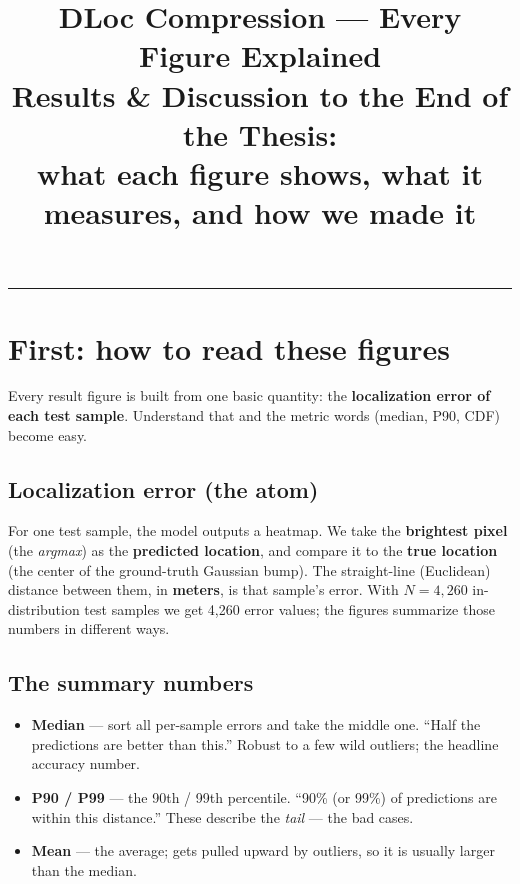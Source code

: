 \documentclass[11pt]{article}
\title{\textbf{DLoc Compression --- Every Figure Explained}\\[2mm]
\large Results \& Discussion to the End of the Thesis:\\
what each figure shows, what it measures, and how we made it}
\date{}
\begin{document}
\maketitle
\tableofcontents
\vspace{3mm}\hrule\vspace{3mm}

\section{First: how to read these figures}

Every result figure is built from one basic quantity: the \textbf{localization error of each test
sample}. Understand that and the metric words (median, P90, CDF) become easy.

\subsection*{Localization error (the atom)}
For one test sample, the model outputs a heatmap. We take the \textbf{brightest pixel} (the
\emph{argmax}) as the \textbf{predicted location}, and compare it to the \textbf{true location} (the
center of the ground-truth Gaussian bump). The straight-line (Euclidean) distance between them, in
\textbf{meters}, is that sample's error. With $N = 4{,}260$ in-distribution test samples we get 4{,}260
error values; the figures summarize those numbers in different ways.

\subsection*{The summary numbers}
\begin{itemize}[leftmargin=*,noitemsep]
  \item \textbf{Median} --- sort all per-sample errors and take the middle one. ``Half the predictions
        are better than this.'' Robust to a few wild outliers; the headline accuracy number.
  \item \textbf{P90 / P99} --- the 90th / 99th percentile. ``90\% (or 99\%) of predictions are within
        this distance.'' These describe the \emph{tail} --- the bad cases.
  \item \textbf{Mean} --- the average; gets pulled upward by outliers, so it is usually larger than the
        median.
\end{itemize}
\end{document}

